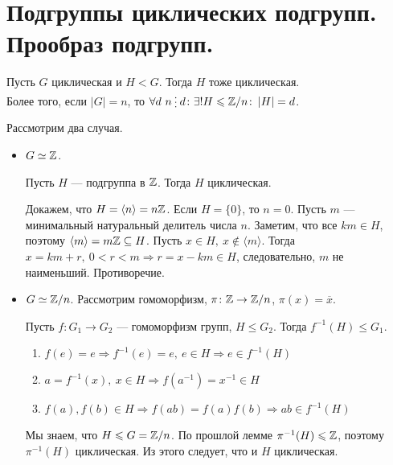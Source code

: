 % 
% 
\section{Подгруппы циклических подгрупп. Прообраз подгрупп.}
\begin{thm}
    Пусть $G $ циклическая и $ H < G$. Тогда  $ H$ тоже циклическая.\\ Более того, если $ \left| G \right|  = n$,  то $ \forall d ~ n \del d\colon \exists! H \le \Z/n\colon \left| H \right| = d$. 
\end{thm}
\begin{myproof*}
    Рассмотрим два случая.
    \begin{itemize}
	\item $ G\simeq  \mathbb{Z}$.
	    \begin{lm}
	        Пусть $ H$ --- подгруппа в  $ \mathbb{Z}$. Тогда  $H $ циклическая.
	    \end{lm}
	    \begin{myproof*}
	    Докажем, что $ H = \langle n \rangle = n \mathbb{Z}$. Если $ H = \{0\}$, то  $ n=0$. Пусть  $ m $ --- минимальный натуральный делитель числа  $ n$. Заметим, что все  $ km \in  H$, поэтому $ \langle m \rangle = m\mathbb{Z} \subseteq H$. Пусть $ x \in  H, ~ x \not\in \langle m \rangle$. Тогда $ x = km + r, ~ 0< r < m \Longrightarrow r = x - km \in H$, следовательно,  $ m $ не наименьший. Противоречие. 
	    \end{myproof*}
	\item $  G \simeq \mathbb{Z} / n$. Рассмотрим гомоморфизм, $ \pi\colon \mathbb{Z} \to  \mathbb{Z} / n$, $ \pi(x) = \overline{x}$.
	    \begin{lm}
		Пусть $ f\colon G_1 \to  G_2$ --- гомоморфизм групп, $ H \le G_2$. Тогда $ f^{-1}(H) \le G_1$.
	    \end{lm}
	    \begin{myproof*}
		\begin{enumerate}[noitemsep]
		    \item  $ f(e) = e \Longrightarrow f^{-1}(e) = e, ~ e \in  H \Longrightarrow e \in  f^{-1}(H)$
		    \item $ a = f^{-1}(x), ~ x \in H \Longrightarrow f(a^{-1}) = x ^{-1} \in H$
		    \item $ f(a), f(b) \in H \Longrightarrow f(ab) = f(a)f(b) \Longrightarrow ab \in f^{-1}(H)$
	        \end{enumerate}
	    \end{myproof*}
	    Мы знаем, что $ H \leqslant G = \mathbb{Z} /n$. По прошлой лемме $ \pi^{-1}(H) \leqslant \mathbb{Z}$, поэтому $ \pi^{-1}(H)$ циклическая. Из этого следует, что и $ H$ циклическая.


\end{itemize}
\end{myproof*}
